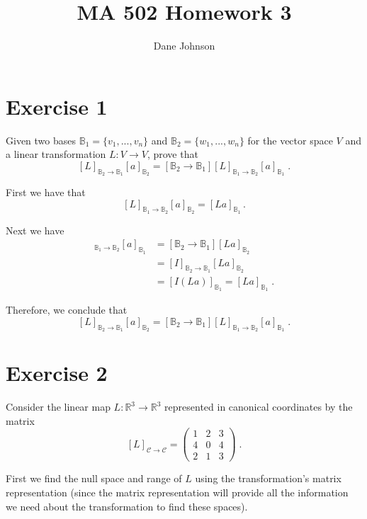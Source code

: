 \documentclass[11pt]{article}
\title{MA 502 Homework 3}
\author{Dane Johnson}
\begin{document}
\maketitle

\section*{Exercise 1}

Given two bases $\mathbb{B}_1 = \{v_1,...,v_n\}$ and $\mathbb{B}_2 = \{w_1,...,w_n\}$ for the vector space $V$ and a linear transformation $L : V \rightarrow V$, prove that
$$[L]_{\mathbb{B}_2 \rightarrow \mathbb{B}_1}[a]_{\mathbb{B}_2} = [\mathbb{B}_2 \rightarrow \mathbb{B}_1][L]_{\mathbb{B}_1 \rightarrow \mathbb{B}_2}[a]_{\mathbb{B}_1} \;.$$

First we have that $$[L]_{\mathbb{B}_1 \rightarrow \mathbb{B}_2}[a]_{\mathbb{B}_2} = [La]_{\mathbb{B}_1} \,.$$

Next we have
\begin{align*}
[\mathbb{B}_2 \rightarrow \mathbb{B}_1][L]_{\mathbb{B}_1 \rightarrow \mathbb{B}_2}[a]_{\mathbb{B}_1} &= [\mathbb{B}_2 \rightarrow \mathbb{B}_1][La]_{\mathbb{B}_2} \\
&= [I]_{\mathbb{B}_2 \rightarrow \mathbb{B}_1} [La]_{\mathbb{B}_2} \\
&= [I(La)]_{\mathbb{B}_1} = [La]_{\mathbb{B}_1} \;.
\end{align*}

Therefore, we conclude that 
$$[L]_{\mathbb{B}_2 \rightarrow \mathbb{B}_1}[a]_{\mathbb{B}_2} = [\mathbb{B}_2 \rightarrow \mathbb{B}_1][L]_{\mathbb{B}_1 \rightarrow \mathbb{B}_2}[a]_{\mathbb{B}_1} \;.$$

\section*{Exercise 2}

Consider the linear map $L : \mathbb{R}^3 \rightarrow \mathbb{R}^3$ represented in canonical coordinates by the matrix
$$[L]_{\mathcal{C} \rightarrow \mathcal{C}} = \begin{pmatrix}
1&2&3 \\ 4&0&4 \\ 2&1&3
\end{pmatrix} \;.$$

First we find the null space and range of $L$ using the transformation's matrix representation (since the matrix representation will provide all the information we need about the transformation to find these spaces). \\
\end{document}
